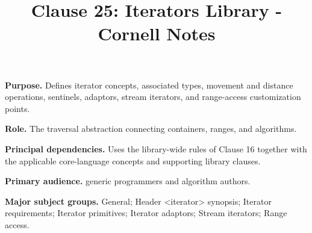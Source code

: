 \documentclass[11pt,letterpaper]{article}
\title{Clause 25: Iterators Library - Cornell Notes}
\author{}
\date{}
\begin{document}
\maketitle
\begin{CornellReferenceOrientationBox}
\textbf{Purpose.} Defines iterator concepts, associated types, movement and distance operations, sentinels, adaptors, stream iterators, and range-access customization points.
\par\textbf{Role.} The traversal abstraction connecting containers, ranges, and algorithms.
\par\textbf{Principal dependencies.} Uses the library-wide rules of Clause 16 together with the applicable core-language concepts and supporting library clauses.
\par\textbf{Primary audience.} generic programmers and algorithm authors.
\par\textbf{Major subject groups.} General; Header <iterator> synopsis; Iterator requirements; Iterator primitives; Iterator adaptors; Stream iterators; Range access.
\end{CornellReferenceOrientationBox}
\end{document}

